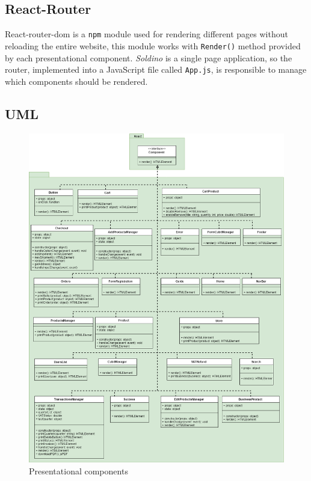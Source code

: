 \subsection{React-Router} 
React-router-dom is a \texttt{npm} module used for rendering different pages without reloading the entire website, this module works with \texttt{Render()} method provided by each presentational component. \textit{Soldino} is a single page application, so the router, implemented into a JavaScript file called \texttt{App.js}, is responsible to manage which components should be rendered.

\subsection{UML} 
\begin{figure}[H]
	\centering\includegraphics[scale = 0.38]{res/images/Presentational.png}
	\caption{Presentational components}
\end{figure}
